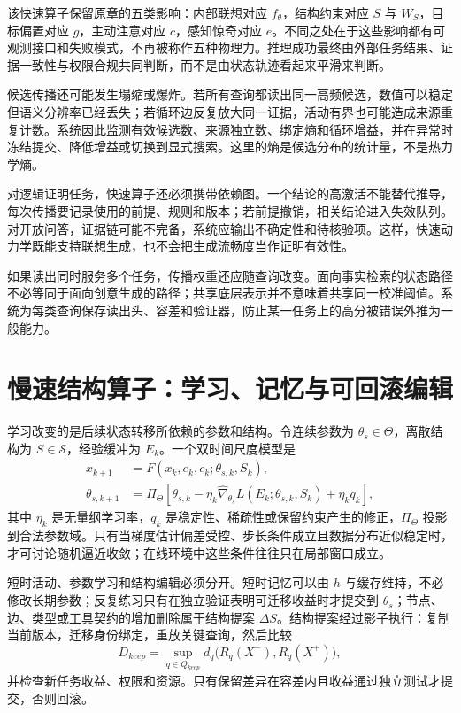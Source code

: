 该快速算子保留原章的五类影响：内部联想对应 $f_\theta$，结构约束对应 $S$ 与 $W_S$，目标偏置对应 $g$，主动注意对应 $c$，感知惊奇对应 $e$。不同之处在于这些影响都有可观测接口和失败模式，不再被称作五种物理力。推理成功最终由外部任务结果、证据一致性与权限合规共同判断，而不是由状态轨迹看起来平滑来判断。

候选传播还可能发生塌缩或爆炸。若所有查询都读出同一高频候选，数值可以稳定但语义分辨率已经丢失；若循环边反复放大同一证据，活动有界也可能造成来源重复计数。系统因此监测有效候选数、来源独立数、绑定熵和循环增益，并在异常时冻结提交、降低增益或切换到显式搜索。这里的熵是候选分布的统计量，不是热力学熵。

对逻辑证明任务，快速算子还必须携带依赖图。一个结论的高激活不能替代推导，每次传播要记录使用的前提、规则和版本；若前提撤销，相关结论进入失效队列。对开放问答，证据链可能不完备，系统应输出不确定性和待核验项。这样，快速动力学既能支持联想生成，也不会把生成流畅度当作证明有效性。

如果读出同时服务多个任务，传播权重还应随查询改变。面向事实检索的状态路径不必等同于面向创意生成的路径；共享底层表示并不意味着共享同一校准阈值。系统为每类查询保存读出头、容差和验证器，防止某一任务上的高分被错误外推为一般能力。

\section{慢速结构算子：学习、记忆与可回滚编辑}
\label{sec:section_1246}

学习改变的是后续状态转移所依赖的参数和结构。令连续参数为 $\theta_s\in\Theta$，离散结构为 $S\in\mathcal S$，经验缓冲为 $E_k$。一个双时间尺度模型是
\begin{align}
x_{k+1}&=F(x_k,e_k,c_k;\theta_{s,k},S_k),\\
\theta_{s,k+1}&=\Pi_\Theta\!\left[\theta_{s,k}-\eta_k\widehat\nabla_{\theta_s}L(E_k;\theta_{s,k},S_k)+\eta_k q_k\right],
\end{align}
其中 $\eta_k$ 是无量纲学习率，$q_k$ 是稳定性、稀疏性或保留约束产生的修正，$\Pi_\Theta$ 投影到合法参数域。只有当梯度估计偏差受控、步长条件成立且数据分布近似稳定时，才可讨论随机逼近收敛；在线环境中这些条件往往只在局部窗口成立。

短时活动、参数学习和结构编辑必须分开。短时记忆可以由 $h$ 与缓存维持，不必修改长期参数；反复练习只有在独立验证表明可迁移收益时才提交到 $\theta_s$；节点、边、类型或工具契约的增加删除属于结构提案 $\Delta S$。结构提案经过影子执行：复制当前版本，迁移身份绑定，重放关键查询，然后比较
\begin{equation}
D_{keep}=\sup_{q\in Q_{keep}}d_q\bigl(R_q(X^-),R_q(X^+)\bigr),
\end{equation}
并检查新任务收益、权限和资源。只有保留差异在容差内且收益通过独立测试才提交，否则回滚。

